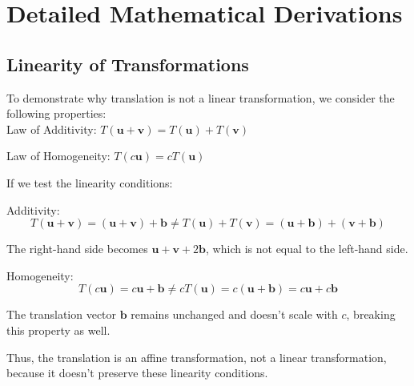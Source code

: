 \documentclass[12pt]{article}
\begin{document}
\appendix
\section{Detailed Mathematical Derivations}
\label{sec:appendix-derivations}

\subsection{Linearity of Transformations}
\label{sec:appendix-derivations-linear}
To demonstrate why translation is not a linear transformation, we consider the following properties: \\

Law of Additivity: \( T(\mathbf{u} + \mathbf{v}) = T(\mathbf{u}) + T(\mathbf{v}) \)

Law of Homogeneity: \( T(c\mathbf{u}) = cT(\mathbf{u}) \)

If we test the linearity conditions:

Additivity:
\[
    T(\mathbf{u} + \mathbf{v}) = (\mathbf{u} + \mathbf{v}) + \mathbf{b} \neq T(\mathbf{u}) + T(\mathbf{v}) = (\mathbf{u} + \mathbf{b}) + (\mathbf{v} + \mathbf{b})
\]

The right-hand side becomes \( \mathbf{u} + \mathbf{v} + 2\mathbf{b} \), which is not equal to the left-hand side.

Homogeneity:
\[
    T(c\mathbf{u}) = c\mathbf{u} + \mathbf{b} \neq cT(\mathbf{u}) = c(\mathbf{u} + \mathbf{b}) = c\mathbf{u} + c\mathbf{b}
\]

The translation vector \( \mathbf{b} \) remains unchanged and doesn’t scale with \( c \), breaking this property as well.

Thus, the translation is an affine transformation, not a linear transformation, because it doesn’t preserve these linearity conditions.
\end{document}
